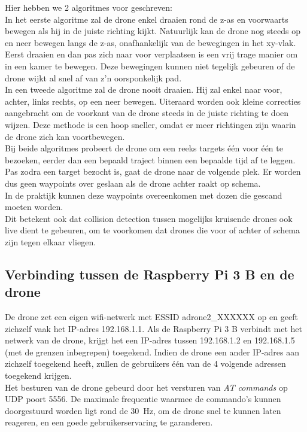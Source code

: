 Hier hebben we 2 algoritmes voor geschreven:\\
In het eerste algoritme zal de drone enkel draaien rond de z-as en voorwaarts bewegen als hij in de juiste richting kijkt.
Natuurlijk kan de drone nog steeds op en neer bewegen langs de z-as, onafhankelijk van de bewegingen in het xy-vlak.
Eerst draaien en dan pas zich naar voor verplaatsen is een vrij trage manier om in een kamer te bewegen.
Deze bewegingen kunnen niet tegelijk gebeuren of de drone wijkt al snel af van z'n oorsponkelijk pad.\\
In een tweede algoritme zal de drone nooit draaien.
Hij zal enkel naar voor, achter, links rechts, op een neer bewegen.
Uiteraard worden ook kleine correcties aangebracht om de voorkant van de drone steeds in de juiste richting te doen wijzen.
Deze methode is een hoop sneller, omdat er meer richtingen zijn waarin de drone zich kan voortbewegen.\\

Bij beide algoritmes probeert de drone om een reeks targets \'e\'en voor \'e\'en te bezoeken, eerder dan een bepaald traject binnen een bepaalde tijd af te leggen.
Pas zodra een target bezocht is, gaat de drone naar de volgende plek.
Er worden dus geen waypoints over geslaan als de drone achter raakt op schema.\\
In de praktijk kunnen deze waypoints overeenkomen met dozen die gescand moeten worden.\\
Dit betekent ook dat collision detection tussen mogelijks kruisende drones ook live dient te gebeuren, om te voorkomen dat drones die voor of achter of schema zijn tegen elkaar vliegen.

\subsection{Verbinding tussen de Raspberry Pi 3 B en de drone} \label{sec:raspberry_drone}
De drone zet een eigen wifi-netwerk met ESSID adrone2\_XXXXXX  op en geeft zichzelf vaak het IP-adres 192.168.1.1.
Als de Raspberry Pi 3 B verbindt met het netwerk van de drone, krijgt het een IP-adres tussen 192.168.1.2 en 192.168.1.5 (met de grenzen inbegrepen) toegekend.
Indien de drone een ander IP-adres aan zichzelf toegekend heeft, zullen de gebruikers één van de 4 volgende adressen toegekend krijgen.\\
Het besturen van de drone gebeurd door het versturen van \textit{AT commands} op UDP poort 5556.
De maximale frequentie waarmee de commando's kunnen doorgestuurd worden ligt rond de \SI{30}{\Hz}, om de drone snel te kunnen laten reageren, en een goede gebruikerservaring te garanderen.\\ 

